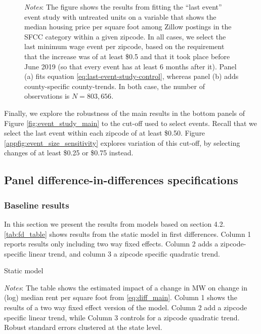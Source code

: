 \begin{figure}[h!]
        \begin{minipage}{.95\textwidth} \footnotesize
			\vspace{2mm} 
			\textit{Notes}: The figure shows the results from fitting the ``last event'' event study with untreated units on a variable that shows the median housing price per square foot among Zillow postings in the SFCC category within a given zipcode. In all cases, we select the last minimum wage event per zipcode, based on the requirement that the increase was of at least \$0.5 and that it took place before June 2019 (so that every event has at least 6 months after it). Panel (a) fits equation \ref{eq:last-event-study-control}, whereas panel (b) adds county-specific county-trends. In both case, the number of observations is $N = 803,656$.
		\end{minipage}
    \end{figure}
    
    Finally, we explore the robustness of the main results in the bottom panels of Figure \ref{fig:event_study_main} to the cut-off used to select events. Recall that we select the last event within each zipcode of at least \$0.50. Figure \ref{appfig:event_size_sensitivity} explores variation of this cut-off, by selecting changes of at least \$0.25 or \$0.75 instead.
    
    
    
\subsection{Panel difference-in-differences specifications}\label{subsec:results/first-differences}

    \subsubsection{Baseline results}
    
    In this section we present the results from models based on section 4.2. \autoref{tab:fd_table} shows results from the static model in first differences. Column 1 reports results only including two way fixed effects. Column 2 adds a zipcode-specific linear trend, and column 3 a zipcode specific quadratic trend. 
    
    \begin{table}[h!] \centering
        \caption{Static model}
        \label{tab:fd_table}
        \scalebox{0.85}{
        }
        \begin{minipage}{.95\textwidth} \footnotesize
			\vspace{3mm} 
			\textit{Notes}: The table shows the estimated impact of a change in MW on change in (log) median rent per square foot from \autoref{eq:diff_main}. Column 1 shows the results of a two way fixed effect version of the model. Column 2 add a zipcode specific linear trend, while Column 3 controls for a zipcode quadratic trend. Robust standard errors clustered at the state level.  
		\end{minipage}
    \end{table}
    

